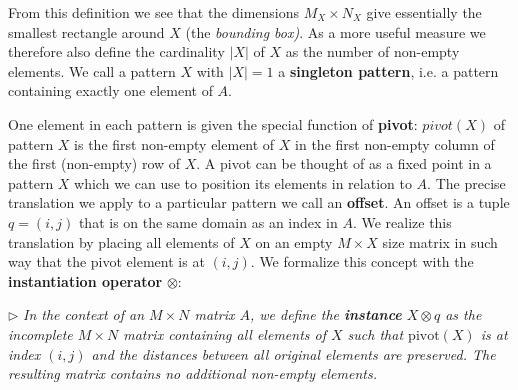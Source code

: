 \documentclass{llncs}
\begin{document}

From this definition we see that the dimensions $M_X\times N_X$ give essentially the smallest rectangle around $X$ (the \emph{bounding box)}. As a more useful measure we therefore also define the cardinality $|X|$ of $X$ as the number of non-empty elements. We call a pattern $X$ with $|X|=1$ a \textbf{singleton pattern}, i.e. a pattern containing exactly one element of $A$. %

One element in each pattern is given the special function of \textbf{pivot}: %
$pivot(X)$ of pattern $X$ is the first non-empty element of $X$ in the first non-empty column of the first (non-empty) row of $X$.
\noindent
A pivot can be thought of as a fixed point in a pattern $X$ which we can use to position its elements in relation to $A$. The precise translation we apply to a particular pattern we call an \textbf{offset}. An offset is a tuple ${q}=(i,j)$ that is on the same domain as an index in $A$. We realize this translation by placing all elements of $X$ on an empty $M\times X$ size matrix in such way that the pivot element is at $(i,j)$. We formalize this concept with the \textbf{instantiation operator} $\otimes$:

\smallskip
\noindent $\triangleright$
\emph{In the context of an $M\times N$ matrix $A$, we define the \textbf{instance} $X \otimes {q}$ as the incomplete $M\times N$ matrix containing all elements of $X$ such that $\mathrm{pivot}(X)$ is at index $(i,j)$ and the distances between all original elements are preserved. The resulting matrix contains no additional non-empty elements. } %
\smallskip
\end{document}
